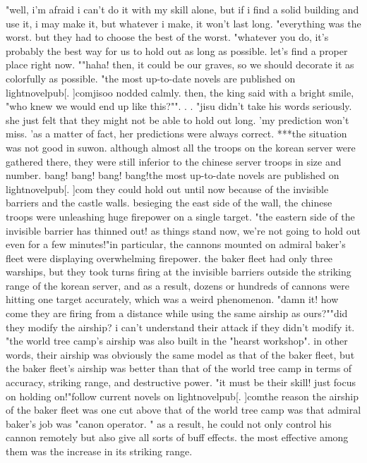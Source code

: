 "well, i'm afraid i can't do it with my skill alone, but if i find a solid building and use it, i may make it, but whatever i make, it won't last long.
"everything was the worst.
 but they had to choose the best of the worst.
"whatever you do, it's probably the best way for us to hold out as long as possible.
 let's find a proper place right now.
""haha! then, it could be our graves, so we should decorate it as colorfully as possible.
"the most up-to-date novels are published on lightnovelpub[.
]comjisoo nodded calmly.
 then, the king said with a bright smile, "who knew we would end up like this?"".
.
.
"jisu didn't take his words seriously.
 she just felt that they might not be able to hold out long.
'my prediction won't miss.
'as a matter of fact, her predictions were always correct.
***the situation was not good in suwon.
 although almost all the troops on the korean server were gathered there, they were still inferior to the chinese server troops in size and number.
bang! bang! bang! bang!the most up-to-date novels are published on lightnovelpub[.
]com
they could hold out until now because of the invisible barriers and the castle walls.
besieging the east side of the wall, the chinese troops were unleashing huge firepower on a single target.
 "the eastern side of the invisible barrier has thinned out! as things stand now, we're not going to hold out even for a few minutes!"in particular, the cannons mounted on admiral baker's fleet were displaying overwhelming firepower.
the baker fleet had only three warships, but they took turns firing at the invisible barriers outside the striking range of the korean server, and as a result, dozens or hundreds of cannons were hitting one target accurately, which was a weird phenomenon.
"damn it! how come they are firing from a distance while using the same airship as ours?""did they modify the airship? i can't understand their attack if they didn't modify it.
"the world tree camp's airship was also built in the "hearst workshop".
 in other words, their airship was obviously the same model as that of the baker fleet, but the baker fleet's airship was better than that of the world tree camp in terms of accuracy, striking range, and destructive power.
"it must be their skill! just focus on holding on!"follow current novels on lightnovelpub[.
]comthe reason the airship of the baker fleet was one cut above that of the world tree camp was that admiral baker's job was "canon operator.
" as a result, he could not only control his cannon remotely but also give all sorts of buff effects.
 the most effective among them was the increase in its striking range.
